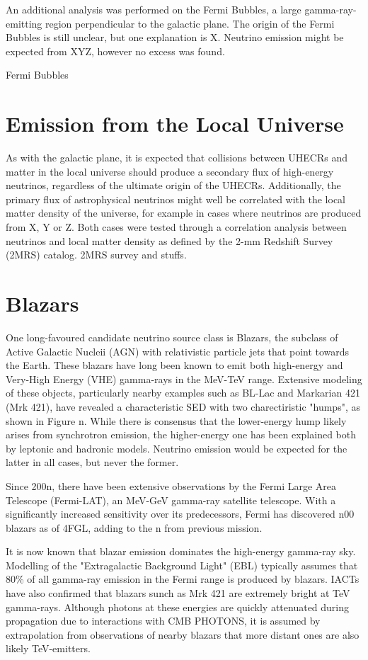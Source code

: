 An additional analysis was performed on the Fermi Bubbles, a large gamma-ray-emitting region perpendicular to the galactic plane. The origin of the Fermi Bubbles is still unclear, but one explanation is X. Neutrino emission might be expected from XYZ, however no excess was found. 

Fermi Bubbles
\section{Emission from the Local Universe}
As with the galactic plane, it is expected that collisions between UHECRs and matter in the local universe should produce a secondary flux of high-energy neutrinos, regardless of the ultimate origin of the UHECRs. Additionally, the primary flux of astrophysical neutrinos might well be correlated with the local matter density of the universe, for example in cases where neutrinos are produced from X, Y or Z. Both cases were tested through a correlation analysis between neutrinos and local matter density as defined by the 2-mm Redshift Survey (2MRS) catalog. 
2MRS survey and stuffs.

\section{Blazars}
One long-favoured candidate neutrino source class is Blazars, the subclass of Active Galactic Nucleii (AGN) with relativistic particle jets that point towards the Earth. These blazars have long been known to emit both high-energy  and Very-High Energy (VHE) gamma-rays in the MeV-TeV range. Extensive modeling of these objects, particularly nearby examples such as BL-Lac and Markarian 421 (Mrk 421), have revealed a characteristic SED with two charectiristic "humps", as shown in Figure n. While there is consensus that the lower-energy hump likely arises from synchrotron emission,  the higher-energy one has been explained both by leptonic and hadronic models. Neutrino emission would be expected for the latter in all cases, but never the former.

Since 200n, there have been extensive observations by the Fermi Large Area Telescope (Fermi-LAT), an MeV-GeV gamma-ray satellite telescope. With a significantly increased sensitivity over its predecessors, Fermi has discovered n00 blazars as of 4FGL, adding to the  n from previous mission.

It is now known that blazar emission dominates the high-energy gamma-ray sky. Modelling of the "Extragalactic Background Light" (EBL) typically assumes that 80\% of all gamma-ray emission in the Fermi range is produced by blazars. IACTs have also confirmed that blazars sunch as Mrk 421 are extremely bright at TeV gamma-rays. Although photons at these energies are quickly attenuated during propagation due to interactions with CMB PHOTONS, it is assumed by extrapolation from observations of nearby blazars that more distant ones are also likely TeV-emitters.

